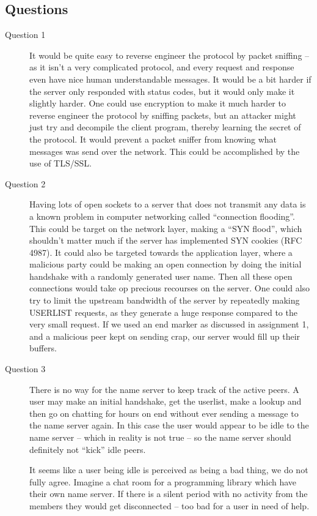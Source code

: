 \subsection{Questions}
\begin{description} %
    \item[Question 1]
        It would be quite easy to reverse engineer the protocol by packet sniffing -- as it isn't a very complicated protocol, and every request and response even have nice human understandable messages. It would be a bit harder if the server only responded with status codes, but it would only make it slightly harder.
        One could use encryption to make it much harder to reverse engineer the protocol by sniffing packets, but an attacker might just try and decompile the client program, thereby learning the secret of the protocol. It would prevent a packet sniffer from knowing what messages was send over the network. This could be accomplished by the use of TLS/SSL.

    \item[Question 2]
        Having lots of open sockets to a server that does not transmit any data is a known problem in computer networking called ``connection flooding''. This could be target on the network layer, making a ``SYN flood'', which shouldn't matter much if the server has implemented SYN cookies (RFC 4987). It could also be targeted towards the application layer, where a malicious party could be making an open connection by doing the initial handshake with a randomly generated user name. Then all these open connections would take op precious recourses on the server. One could also try to limit the upstream bandwidth of the server by repeatedly making USERLIST requests, as they generate a huge response compared to the very small request.
        If we used an end marker as discussed in assignment 1, and a malicious peer kept on sending crap, our server would fill up their buffers.

    \item[Question 3]
        There is no way for the name server to keep track of the active peers. A user may make an initial handshake, get the userlist, make a lookup and then go on chatting for hours on end without ever sending a message to the name server again. In this case the user would appear to be idle to the name server -- which in reality is not true -- so the name server should definitely not ``kick'' idle peers.

        It seems like a user being idle is perceived as being a bad thing, we do not fully agree. Imagine a chat room for a programming library which have their own name server. If there is a silent period with no activity from the members they would get disconnected -- too bad for a user in need of help.


\end{description}
